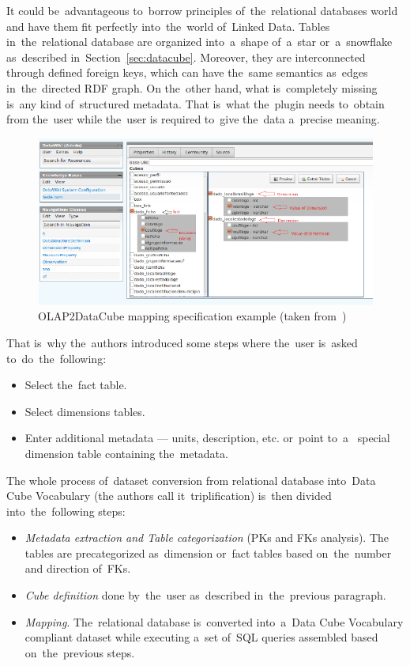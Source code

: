 It could be~advantageous to~borrow principles of~the~relational databases world and have them
fit perfectly into~the~world of~Linked Data. Tables in~the~relational database 
are organized into~a~shape of~a~star or~a~snowflake as~described in~Section~\ref{sec:datacube}.
Moreover, they are interconnected through defined foreign keys,
which can have the~same semantics as~edges in~the~directed RDF graph.
On the~other hand, what is~completely missing is~any kind of~structured
metadata. That is~what the~plugin needs to~obtain from the~user while the~user
is required to~give the~data a~precise meaning.

\begin{figure}
	\centering
	\includegraphics[width=140mm]{img/olapimport.png}
	\caption{OLAP2DataCube mapping specification example (taken from~\cite{olap2dc-paper})}
	\label{fig:olap2dc-screen}
\end{figure}


That is~why the~authors introduced some steps where the~user is~asked to~do~the~following:
\begin{itemize}
  \item Select the~fact table.
  \item Select dimensions tables.
  \item Enter additional metadata --- units, description, etc. or~point to~a~  special dimension table containing the~metadata.
\end{itemize}

The whole process of~dataset conversion from relational database into~Data Cube Vocabulary
(the authors call it~triplification) is~then divided into~the~following steps:
\begin{itemize}
  \item \emph{Metadata extraction and Table categorization} (PKs and FKs analysis). The~  tables are precategorized as~dimension or~fact tables based on~the~number and 
  direction of~FKs.
  \item \emph{Cube definition} done by~the~user as~described in~the~previous paragraph.
  \item \emph{Mapping}. The~relational database is~converted into~a~Data Cube 
  Vocabulary compliant dataset while executing a~set of~SQL queries assembled 
  based on~the~previous steps.
\end{itemize}

